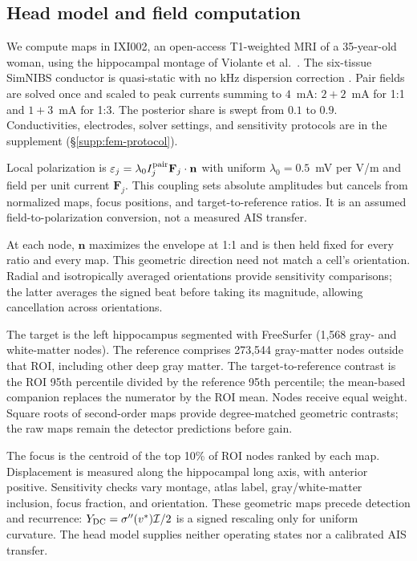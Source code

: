 \documentclass[11pt,a4paper]{article}
\newif\ifjne
\newcommand{\Sig}{\sigma}
\begin{document}
\subsection{Head model and field computation}\label{sec:fem-methods}
\ifjne
We compute maps in IXI002, an open-access T1-weighted MRI of a 35-year-old
woman, using the hippocampal montage of Violante et al.\ \cite{violante2023}.
The six-tissue SimNIBS conductor is quasi-static with no kHz dispersion correction
\cite{salvador2025}. Pair fields are solved once and scaled to peak currents
summing to $4$~mA: $2+2$~mA for 1:1 and $1+3$~mA for 1:3. The posterior share
is swept from $0.1$ to $0.9$. Conductivities, electrodes, solver settings,
and sensitivity protocols are in the supplement (\S\ref{supp:fem-protocol}).

Local polarization is $\varepsilon_j=\lambda_0 I_j^{\rm pair}\mathbf F_j\cdot\mathbf n$
with uniform $\lambda_0=0.5$~mV per V/m \cite{radman2009} and field per unit
current $\mathbf F_j$. This coupling sets absolute amplitudes but cancels from
normalized maps, focus positions, and target-to-reference ratios. It is an
assumed field-to-polarization conversion, not a measured AIS transfer.

At each node, $\mathbf n$ maximizes the envelope at 1:1 and is then held fixed
for every ratio and every map. This geometric direction need not match a cell's
orientation. Radial and isotropically averaged orientations provide sensitivity
comparisons; the latter averages the signed beat before taking its magnitude,
allowing cancellation across orientations.

The target is the left hippocampus segmented with FreeSurfer (1,568 gray- and
white-matter nodes). The reference comprises 273,544 gray-matter nodes outside
that ROI, including other deep gray matter. The target-to-reference contrast
is the ROI 95th percentile divided by the reference 95th percentile; the
mean-based companion replaces the numerator by the ROI mean. Nodes receive
equal weight. Square roots of second-order maps provide degree-matched geometric
contrasts; the raw maps remain the detector predictions before gain.

The focus is the centroid of the top 10\% of ROI nodes ranked by each map.
Displacement is measured along the hippocampal long axis, with anterior positive.
Sensitivity checks vary montage, atlas label, gray/white-matter inclusion,
focus fraction, and orientation. These geometric maps precede detection and
recurrence: $Y_{\rm DC}=\Sig''(v^*)\mathcal I/2$ is a signed rescaling only
for uniform curvature. The head model supplies neither operating states nor
a calibrated AIS transfer.
\end{document}
